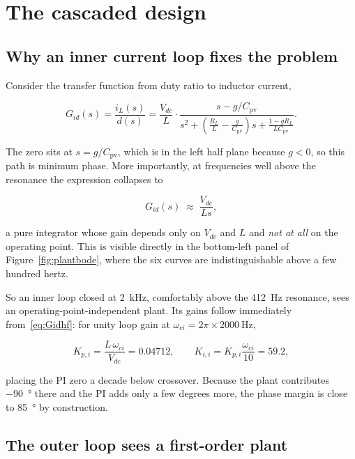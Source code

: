 \section{The cascaded design}

\subsection{Why an inner current loop fixes the problem}

Consider the transfer function from duty ratio to inductor current,

\begin{equation}
G_{id}(s) = \frac{i_L(s)}{d(s)}
= \frac{V_{dc}}{L}\cdot
  \frac{s - g/C_{\mathrm{pv}}}
       {s^2 + \left(\tfrac{R_L}{L} - \tfrac{g}{C_{\mathrm{pv}}}\right)s + \tfrac{1-gR_L}{L C_{\mathrm{pv}}}} .
\label{eq:Gid}
\end{equation}

The zero sits at $s = g/C_{\mathrm{pv}}$, which is in the left half plane
because $g < 0$, so this path is minimum phase. More importantly, at frequencies
well above the resonance the expression collapses to

\begin{equation}
G_{id}(s) \;\approx\; \frac{V_{dc}}{L s},
\label{eq:Gidhf}
\end{equation}

a pure integrator whose gain depends only on $V_{dc}$ and $L$ and \emph{not at
all} on the operating point. This is visible directly in the bottom-left panel
of Figure~\ref{fig:plantbode}, where the six curves are indistinguishable above
a few hundred hertz.

So an inner loop closed at \SI{2}{\kilo\hertz}, comfortably above the
\SI{412}{\hertz} resonance, sees an operating-point-independent plant. Its gains
follow immediately from~\eqref{eq:Gidhf}: for unity loop gain at
$\omega_{ci} = 2\pi \times \SI{2000}{\hertz}$,

\begin{equation}
K_{p,i} = \frac{L\,\omega_{ci}}{V_{dc}} = \num{0.04712},
\qquad
K_{i,i} = K_{p,i}\frac{\omega_{ci}}{10} = \num{59.2},
\end{equation}

placing the PI zero a decade below crossover. Because the plant contributes
\SI{-90}{\degree} there and the PI adds only a few degrees more, the phase
margin is close to \SI{85}{\degree} by construction.

\subsection{The outer loop sees a first-order plant}

